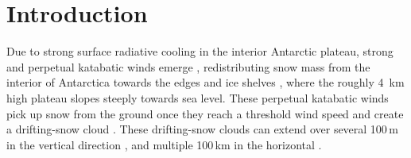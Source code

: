 \documentclass[draft]{agujournal2019}
\begin{document}
%


%
%
%
%


\section{Introduction}
Due to strong surface radiative cooling in the interior Antarctic plateau, strong and perpetual katabatic winds emerge \cite{Parish2007}, redistributing snow mass from the interior of Antarctica towards the edges and ice shelves \cite{Lenaerts2012b}, where the roughly 4~km high plateau slopes steeply towards sea level. These perpetual katabatic winds pick up snow from the ground once they reach a threshold wind speed and create a drifting-snow cloud \cite{Schmidt1980,Amory2017}. These drifting-snow clouds can extend over several 100\,m in the vertical direction \cite{Mann2000, Gossart2017, Mahesh2003}, and multiple 100\,km in the horizontal \cite{Palm2018, Mahesh2003, Yang2021}.
\end{document}
